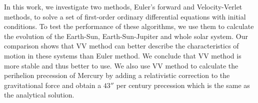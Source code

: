 In this work, we investigate two methods, Euler's forward and Velocity-Verlet methods, 
to solve a set of first-order ordinary differential equations with initial conditions. 
To test the performance of these algorithms, 
we use them to calculate the evolution of the Earth-Sun, Earth-Sun-Jupiter and whole solar system. 
Our comparison shows that VV method can better describe the characteristics of motion in these systems than Euler method. 
We conclude that VV method is more stable and thus better to use. 
We also use VV method to calculate the perihelion precession of Mercury by adding a relativistic correction to the gravitational force 
and obtain a $43''$ per century precession which is the same as the analytical solution. 